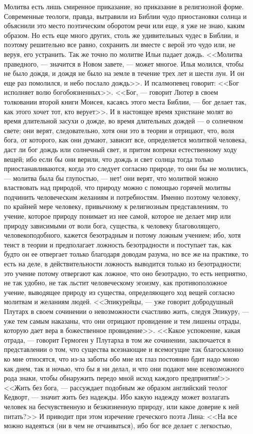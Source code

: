 \documentclass[12pt]{article}
\begin{document}
Молитва есть лишь смиренное приказание, но приказание в религиозной форме. Современные теологи, правда, вытравили из Библии чудо приостановки солнца и объяснили это место поэтическим оборотом речи или еще, я уже не знаю, каким образом. Но есть еще много других, столь же удивительных чудес в Библии, и поэтому решительно все равно, сохранить ли вместе с верой это чудо или, не веруя, его устранить. Так же точно по молитве Ильи падает дождь. <<Молитва праведного, --- значится в Новом завете, --- может многое. Илья молился, чтобы не было дождя, и дождя не было на земле в течение трех лет и шести лун. И он еще раз помолился, и небо послало дождь>>. И псалмопевец говорит: <<Бог исполняет волю богобоязненных>>. <<Бог, --- говорит Лютер в своем толковании второй книги Моисея, касаясь этого места Библии, --- бог делает так, как этого хочет тот, кто верует>>. И в настоящее время христиане молят во время длительной засухи о дожде, во время длительных дождей --- о солнечном свете; они верят, следовательно, хотя они это в теории и отрицают, что, воля бога, от которого, как они думают, зависит все, определяется молитвой человека, даст ли бог дождь или солнечный свет, и притом вопреки естественному ходу вещей; ибо если бы они верили, что дождь и свет солнца тогда только приостанавливаются, когда это следует согласно природе, то они бы не молились, --- молитва была бы глупостью, --- нет! они верят, что молитвой можно властвовать над природой, что природу можно с помощью горячей молитвы подчинить человеческим желаниям и потребностям. Именно поэтому человеку, по крайней мере человеку, привычному к религиозным представлениям, то учение, которое природу понимает из нее самой, которое не делает мир или природу зависимыми от воли бога, существа, к человеку благоволящего, человекоподобного, кажется безотрадным и потому ложным учением; ибо, хотя теист в теории и предполагает ложность безотрадности и поступает так, как будто он ее отвергает только благодаря доводам разума, но все же на практике, то есть на деле, в действительности ложность выводится только из безотрадности; это учение потому отвергают как ложное, что оно безотрадно, то есть неприятно, не так удобно, не так льстит человеческому эгоизму, как противоположное учение, выводящее природу из существа, определяющего ход вещей согласно молитвам и желаниям людей. <<Эпикурейцы, --- уже говорит добродушный Плутарх в своем сочинении о невозможности счастливо жить, следуя Эпикуру, --- уже тем самым наказаны, что они отрицают провидение и тем лишены отрады, которую дает вера в божественное провидение>>. <<Какое успокоение, какая отрада, --- говорит Гермоген у Плутарха в том же сочинении, заключается в представлении о том, что существа всезнающие и всемогущие так благосклонно ко мне относятся, что из-за заботы обо мне их глаз постоянно бдит надо мною как днем, так и ночью, что бы я ни делал, и что они подают мне всевозможного рода знаки, чтобы обнаружить передо мной исход каждого предприятия!>> <<Жить без бога, --- рассуждает подобным же образом английский теолог Кедворт, --- значит жить без надежды. Ибо какую надежду может возлагать человек на бесчувственную и безжизненную природу, или какое доверие к ней питать?>> И приводит при этом изречение греческого поэта Лина: <<На все можно надеяться (ни в чем не отчаиваться), ибо бог все делает с легкостью, 
\end{document}
